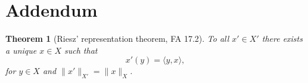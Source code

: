 \documentclass[12pt]{extreport} %
\theoremstyle{named}
\theoremstyle{nnamed}
\theoremstyle{itshape}
\theoremstyle{normal}
\newtheorem*{theorem*}{Theorem}
\begin{document}
\appendix

\chapter*{Addendum}

\begin{theorem*}[Riesz' representation theorem, FA 17.2]
	To all $x' \in X'$ there exists a unique $x \in X$ such that
	$$ x'(y) = \langle y, x \rangle,  $$
	for $y \in X$ and $\|x'\|_{X'} = \|x\|_X$.
\end{theorem*}



\renewcommand{\indexname}{Stichwortverzeichnis}
\printindex
\end{document}
